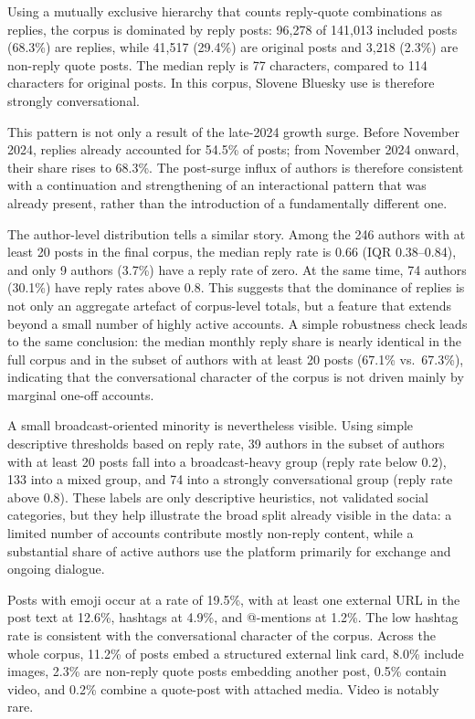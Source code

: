 Using a mutually exclusive hierarchy that counts reply-quote combinations as replies, the corpus is dominated by reply posts: 96,278 of 141,013 included posts (68.3\%) are replies, while 41,517 (29.4\%) are original posts and 3,218 (2.3\%) are non-reply quote posts. The median reply is 77 characters, compared to 114 characters for original posts. In this corpus, Slovene Bluesky use is therefore strongly conversational.

This pattern is not only a result of the late-2024 growth surge. Before November 2024, replies already accounted for 54.5\% of posts; from November 2024 onward, their share rises to 68.3\%. The post-surge influx of authors is therefore consistent with a continuation and strengthening of an interactional pattern that was already present, rather than the introduction of a fundamentally different one.

The author-level distribution tells a similar story. Among the 246 authors with at least 20 posts in the final corpus, the median reply rate is 0.66 (IQR 0.38--0.84), and only 9 authors (3.7\%) have a reply rate of zero. At the same time, 74 authors (30.1\%) have reply rates above 0.8. This suggests that the dominance of replies is not only an aggregate artefact of corpus-level totals, but a feature that extends beyond a small number of highly active accounts. A simple robustness check leads to the same conclusion: the median monthly reply share is nearly identical in the full corpus and in the subset of authors with at least 20 posts (67.1\% vs.\ 67.3\%), indicating that the conversational character of the corpus is not driven mainly by marginal one-off accounts.

A small broadcast-oriented minority is nevertheless visible. Using simple descriptive thresholds based on reply rate, 39 authors in the subset of authors with at least 20 posts fall into a broadcast-heavy group (reply rate below 0.2), 133 into a mixed group, and 74 into a strongly conversational group (reply rate above 0.8). These labels are only descriptive heuristics, not validated social categories, but they help illustrate the broad split already visible in the data: a limited number of accounts contribute mostly non-reply content, while a substantial share of active authors use the platform primarily for exchange and ongoing dialogue.

Posts with emoji occur at a rate of 19.5\%, with at least one external URL in the post text at 12.6\%, hashtags at 4.9\%, and \mbox{@-mentions} at 1.2\%. The low hashtag rate is consistent with the conversational character of the corpus. Across the whole corpus, 11.2\% of posts embed a structured external link card, 8.0\% include images, 2.3\% are non-reply quote posts embedding another post, 0.5\% contain video, and 0.2\% combine a quote-post with attached media. Video is notably rare.

